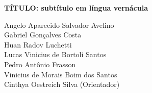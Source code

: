 \documentclass[
article,			%
11pt,				%
twoside,			%
a4paper,			%
section=TITLE,		%
onecolumn,          %
english,			%
brazil,				%
sumario=tradicional
]{abntex2}
\begin{document}
 
\begin{center}
   
    {\bfseries TÍTULO: subtítulo em língua vernácula} \\
   
    \vspace{0.5cm}

\end{center}



\begin{flushright}
    \fontsize{7}{9}\selectfont
    Angelo Aparecido Salvador Avelino\footnotemark[1] \quad   \\
    Gabriel Gonçalves Costa\footnotemark[2] \quad \\
    Huan Radov Luchetti\footnotemark[3] \quad  \\
    Lucas Vinicius de Bortoli Santos\footnotemark[4] \quad  \\
    Pedro Antônio Frasson\footnotemark[5] \quad  \\
    Vinicius de Morais Boim dos Santos\footnotemark[6] \quad  \\
    Cinthya Oestreich Silva (Orientador)\footnotemark[7] \\
\end{flushright}

\vspace{1cm}


\vspace{1cm}



    
    
    \frenchspacing 
    
\end{document}
